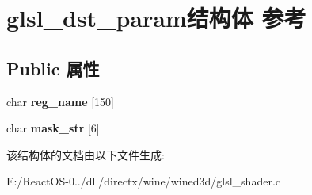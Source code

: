 \hypertarget{structglsl__dst__param}{}\section{glsl\+\_\+dst\+\_\+param结构体 参考}
\label{structglsl__dst__param}
\subsection*{Public 属性}
\begin{DoxyCompactItemize}
\item 
\mbox{\label{structglsl__dst__param_a7d03f4f004cd0c7a142aa6e27c09f61b}} 
char {\bfseries reg\+\_\+name} \mbox{[}150\mbox{]}
\item 
\mbox{\label{structglsl__dst__param_ac91c2ba028a1425eabedc9e9b862abef}} 
char {\bfseries mask\+\_\+str} \mbox{[}6\mbox{]}
\end{DoxyCompactItemize}


该结构体的文档由以下文件生成\+:\begin{DoxyCompactItemize}
\item 
E\+:/\+React\+O\+S-\/0../dll/directx/wine/wined3d/glsl\+\_\+shader.\+c\end{DoxyCompactItemize}
